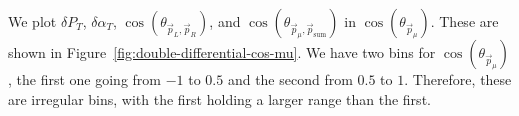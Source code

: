 \documentclass{article}
\newcommand{\vm}{\vec{p}_\mu}
\newcommand{\vlp}{\vec{p}_L}
\newcommand{\vrp}{\vec{p}_R}
\newcommand{\vtp}{\vec{p}_{\text{sum}}}
\begin{document}
We plot $\delta P_T$, $\delta \alpha_T$, $\cos\left(\theta_{\vlp,\vrp}\right)$, and $\cos\left(\theta_{\vm,\vtp}\right)$ in $\cos(\theta_{\vec{p}_{\mu}})$. These are shown in Figure~\ref{fig:double-differential-cos-mu}. We have two bins for $\cos(\theta_{\vec{p}_{\mu}})$, the first one going from $-1$ to $0.5$ and the second from $0.5$ to $1$. Therefore, these are irregular bins, with the first holding a larger range than the first.

\begin{figure}
    \centering
     \\

\end{figure}
\end{document}
